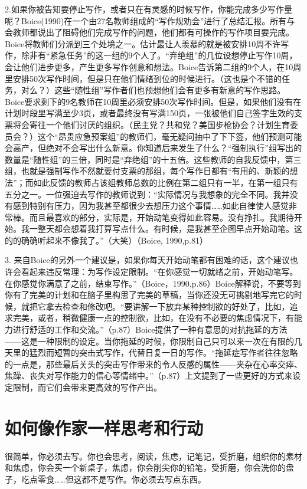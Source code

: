 \documentclass{ctexart}
\begin{document}
2.如果你被告知要停止写作，或者只在有灵感的时候写作，你能完成多少写作量呢？Boice(1990)在一个由27名教师组成的“写作规劝会”进行了总结汇报。所有与会教师都说出了阻碍他们完成写作的问题，他们都有可操作的写作项目要完成。Boice将教师们分派到三个处境之一。估计最让人羡慕的就是被安排10周不许写作，除非有“紧急任务”的这一组的9个人了。“弃绝组”的几位设想停止写作10周，会让他们进步更多，产生更多写作创意和想法。Boice告诉第二组的9个人，在10周里安排50次写作时间，但是只在他们情绪到位的时候进行。（这也是个不错的任务，对么？）这些“随性组”写作者们也预想他们会有更多有新意的写作思路。Boice要求剩下的9名教师在10周里必须安排50次写作时间。但是，如果他们没有在计划时段里写满至少3页，或者最终没有写满150页，一张被他们自己签字生效的支票将会寄往一个他们讨厌的组织。（民主党？共和党？美国步枪协会？计划生育委员会？）这个“昂贵应急预案组”的教师们，毫无疑问抽中了下下签，他们预测可能会高产，但绝对不会写出什么新意。你知道后来发生了什么？“强制执行”组写出的数量是“随性组”的三倍，同时是“弃绝组”的十五倍。这些教师的自我反馈中，第三组，也就是强制写作不然就要付支票的那组，每个写作日都有“有用的、新颖的想法”；而如此反馈的教师占该组教师总数的比例在第二组只有一半，在第一组只有五分之一。一位强迫去写作的教师说到：“实际情况与我想象的完全不同。我并没有感到特别有压力，因为我甚至都很少去想压力这个事情……如此自律使人感觉非常棒。而且最喜欢的部分，实际是，开始动笔变得如此容易。没有挣扎。我期待开始。我一整天都会想着我打算写点什么。有时候，是我甚至企图早点开始动笔。这的的确确听起来不像我了。”（大笑）（Boice, 1990,p.81）

3. 来自Boice的另外一个建议是，如果你每天开始动笔都有困难的话，这个建议也许会看起来违反常理：为写作设定限制。“在你感觉一切就绪之前，开始动笔写。在你感觉你满意了之前，结束写作。”（Boice，1990,p.86）Boice解释说，不要等到你有了完美的计划和在脑子里构思了完美的草稿，当你还没无可挑剔地写完它的时候，就把它拿去检查和修改吧。“要讲解一下放弃某种控制欲的好处了，比如，追求完美，或者，稍微健康一点的控制欲，比如，在没有不必要的焦虑情况下，有能力进行舒适的工作和交流。”（p.87）Boice提供了一种有意思的对抗拖延的方法——这是一种限制的设定。当你拖延的时候，你限制自己只可以来一次在有限的几天里的猛烈而短暂的突击式写作，代替日复一日的写作。“拖延症写作者往往忽略的一点是，那些最后关头的突击写作带来的令人反感的属性——夹杂在心率交瘁、焦躁、丧失对写作能力的信心等情绪中。”（p.87）上文提到了一些更好的方式来设定限制，而它们会带来更高效的写作产出。

\section{如何像作家一样思考和行动}
很简单，你必须去写。你也会思考，阅读，焦虑，记笔记，受折磨，组织你的素材和焦虑，你会买一个新桌子，焦虑，你会削尖你的铅笔，受折磨，你会洗你的盘子，吃点零食……但这都不是写作。你必须去写点东西。
\end{document}
